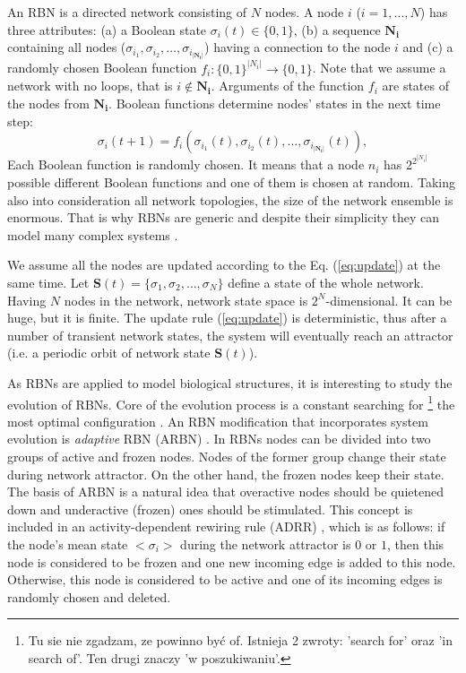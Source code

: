 \documentclass[procedia]{easychair}
\begin{document}
	An RBN is a directed network consisting of ${N}$ nodes. A node $i$ ($i=1, ..., N$) has three attributes: (a) a Boolean state $\sigma_i(t)\in \{0,1\}$, (b) a sequence $\boldsymbol{N_i}$ containing all nodes ($\sigma_{i_1}, \sigma_{i_2}, \ldots, \sigma_{i_{|\boldsymbol{N_i}|}}$) having a connection to the node $i$ and (c) a randomly chosen Boolean function $f_i: \{0,1\}^{|N_i|} \rightarrow \{0,1\}$. 
	Note that we assume a network with no loops, that is  $i \not\in \boldsymbol{N_i}$. 
	Arguments of the function $f_i$ are states of the nodes from $\boldsymbol{N_i}$. Boolean functions determine nodes' states in the next time step:
	\begin{equation}
	\sigma_i(t+1) = f_i(\sigma_{i_1}(t), \sigma_{i_2}(t), \ldots, \sigma_{i_{|\boldsymbol{N_i}|}}(t)),
	\label{eq:update}
	\end{equation}
	Each Boolean function is randomly chosen. It means that a node $n_i$ has $2^{2^{|N_i|}}$ possible different Boolean functions and one of them is chosen at random.
	Taking also into consideration all network topologies, the size of the network ensemble is enormous. That is why RBNs are generic and despite their simplicity they can model many complex systems \cite{drossel2008random}. 
	
	We assume all the nodes are updated according to the Eq. (\ref{eq:update}) at the same time. Let $\boldsymbol{S}(t)=\{\sigma_1, \sigma_2, \ldots, \sigma_N\}$ define a state of the whole network. 
	Having $N$ nodes in the network, network state space is $2^N$-dimensional. It can be huge, but it is finite. The update rule (\ref{eq:update}) is deterministic, thus after a number of transient network states, the system will eventually reach an attractor (i.e. a periodic orbit of network state $\boldsymbol{S}(t)$). 
	
	As RBNs are applied to model biological structures, it is interesting to study the evolution of RBNs. Core of the evolution process is a constant searching for \footnote{Tu sie nie zgadzam, ze powinno być of. Istnieja 2 zwroty: 'search for' oraz 'in search of'. Ten drugi znaczy 'w poszukiwaniu'.} the most optimal configuration \cite{aldana2003boolean,sole1996extinction,zimmermann2004coevolution}. 
	An RBN modification that incorporates system evolution is {\it adaptive} RBN (ARBN) \cite{mlb,soc,haruna14relationship,Gorski2016}. 
	In RBNs nodes can be divided into two groups of active and frozen nodes. Nodes of the former group change their state during network attractor. On the other hand, the frozen nodes keep their state. 
	The basis of ARBN is a natural idea that overactive nodes should be quietened down and underactive (frozen) ones should be stimulated. This concept is included in an activity-dependent rewiring rule (ADRR) \cite{bornholdt2000topological}, which is as follows: 
	if the node’s mean state $<\sigma_i>$ during the network attractor is $0$ or $1$, then this node
	is considered to be frozen and one new incoming edge is
	added to this node. Otherwise, this node is considered to be active and one of
	its incoming edges is randomly chosen and deleted.
	
\end{document}
